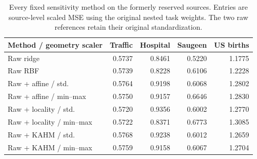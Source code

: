 \begin{table}[t]
\centering
\small
\begin{tabular}{lrrrr}
\toprule
Method / geometry scaler & Traffic & Hospital & Saugeen & US births \\
\midrule
Raw ridge & 0.5737 & 0.8461 & 0.5220 & 1.1775 \\
Raw RBF & 0.5739 & 0.8228 & 0.6106 & 1.2228 \\
Raw + affine / std. & 0.5764 & 0.9198 & 0.6068 & 1.2802 \\
Raw + affine / min--max & 0.5750 & 0.9157 & 0.6646 & 1.2830 \\
Raw + locality / std. & 0.5720 & 0.9356 & 0.6002 & 1.2770 \\
Raw + locality / min--max & 0.5722 & 0.8371 & 0.6773 & 1.3085 \\
Raw + KAHM / std. & 0.5768 & 0.9238 & 0.6012 & 1.2659 \\
Raw + KAHM / min--max & 0.5759 & 0.9158 & 0.6067 & 1.2704 \\
\bottomrule
\end{tabular}
\caption{Every fixed sensitivity method on the formerly reserved sources. Entries are source-level scaled MSE using the original nested task weights. The two raw references retain their original standardization.}
\label{tab:scaling-all-sources-confirmation}
\end{table}

